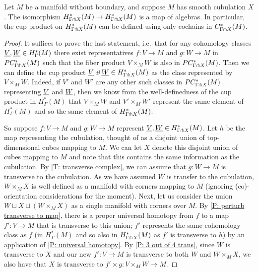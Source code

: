 \documentclass{amsart}
\begin{document}
\begin{proposition}
Let $M$ be a manifold without boundary, and suppose $M$ has smooth cubulation $X$. The isomorphism $H^*_{\Gamma\pitchfork X}(M)\to H^*_{\Gamma\pitchfork X}(M)$ is a map of algebras. In particular, the cup product on $H^*_{\Gamma\pitchfork X}(M)$ can be defined using only cochains in $C^*_{\Gamma \pitchfork X}(M)$.
\end{proposition}
\begin{proof}
It suffices to prove the last statement, i.e.\ that for any cohomology classes $\underline{V},\underline{W}\in H^*_\Gamma(M)$ there exist representatives $f \colon V \to M$ and $g \colon W \to M$ in $PC^*_{\Gamma \pitchfork X}(M)$ such that the fiber product $V \times_M W$ is also in $PC^*_{\Gamma \pitchfork X}(M)$. Then we can define the cup product $\underline{V} \uplus \underline{W} \in H^*_{\Gamma\pitchfork X}(M)$ as the class represented by $V \times_M W$.  Indeed, if $V'$ and $W'$ are any other such classes in $PC^*_{\Gamma \pitchfork X}(M)$ representing $\underline{V}$ and $\underline{W}$, then we know from the well-definedness of the cup product in $H^*_\Gamma(M)$ that $V \times_M W$ and $V' \times_M W'$ represent the same element of $H^*_\Gamma(M)$ and so the same element of $H^*_{\Gamma\pitchfork X}(M)$.

So suppose $f \colon V \to M$ and $g \colon W \to M$ represent $\underline{V},\underline{W}\in H^*_{\Gamma\pitchfork X}(M)$. 
Let $h$ be the map representing the cubulation, thought of as a disjoint union of top-dimensional cubes mapping to $M$. We can let $X$ denote this disjoint union of cubes mapping to $M$ and note that this contains the same information as the cubulation. By \cref{T: transverse complex}, we can assume that $g:W \to M$ is transverse to the cubulation. 
As we have assumed $W$ is transfer to the cubulation, $W \times_M X$ is well defined as a manifold with corners mapping to $M$ (ignoring (co)-orientation considerations for the moment). 
Next, let us consider the union $W\sqcup X\sqcup (W\times_M X)$ as a single manifold with corners over $M$. By \cref{P: perturb transverse to map}, there is a proper universal homotopy from $f$ to a map $f':V\to M$ that is transverse to this union; $f'$ represents the same cohomology class as $f$ (in $H^*_{\Gamma}(M)$ and so also in $H^*_{\Gamma\pitchfork X}(M)$ as $f'$ is transverse to $h$) by an application of \cref{P: universal homotopy}. By \cref{P: 3 out of 4 trans}, since $W$ is transverse to $X$ and our new $f' \colon V \to M$ is transverse to both $W$ and $W\times_MX$, we also have that $X$ is transverse to $f'\times g \colon V\times_M W \to M$. 
\end{proof}
\end{document}
